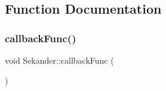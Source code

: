 \subsection{Function Documentation}
\mbox{\label{namespaceSekander_a9abc849b0e833c5c6f3a8b33bdd3f763}} 
\subsubsection{\texorpdfstring{callback\+Func()}{callbackFunc()}}
{\footnotesize\ttfamily void Sekander\+::callback\+Func (\begin{DoxyParamCaption}{ }\end{DoxyParamCaption})}

